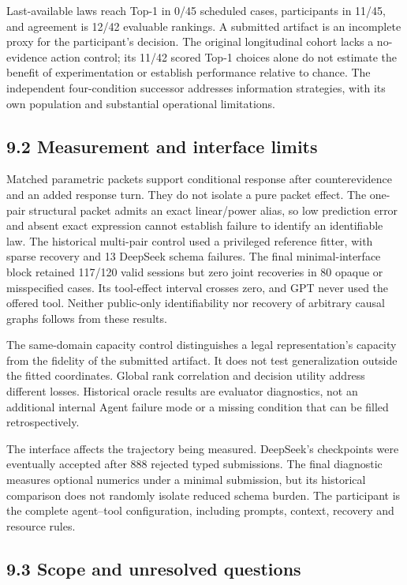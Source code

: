 \documentclass[10pt,twocolumn]{article}
\begin{document}
Last-available laws reach Top-1 in 0/45 scheduled cases, participants in
11/45, and agreement is 12/42 evaluable rankings. A submitted artifact
is an incomplete proxy for the participant's decision. The original
longitudinal cohort lacks a no-evidence action control; its 11/42 scored
Top-1 choices alone do not estimate the benefit of experimentation or
establish performance relative to chance. The independent four-condition
successor addresses information strategies, with its own population and
substantial operational limitations.

\subsection{9.2 Measurement and interface
limits}\label{measurement-and-interface-limits}

Matched parametric packets support conditional response after
counterevidence and an added response turn. They do not isolate a pure
packet effect. The one-pair structural packet admits an exact
linear/power alias, so low prediction error and absent exact expression
cannot establish failure to identify an identifiable law. The historical
multi-pair control used a privileged reference fitter, with sparse
recovery and 13 DeepSeek schema failures. The final minimal-interface
block retained 117/120 valid sessions but zero joint recoveries in 80
opaque or misspecified cases. Its tool-effect interval crosses zero, and
GPT never used the offered tool. Neither public-only identifiability nor
recovery of arbitrary causal graphs follows from these results.

The same-domain capacity control distinguishes a legal representation's
capacity from the fidelity of the submitted artifact. It does not test
generalization outside the fitted coordinates. Global rank correlation
and decision utility address different losses. Historical oracle results
are evaluator diagnostics, not an additional internal Agent failure mode
or a missing condition that can be filled retrospectively.

The interface affects the trajectory being measured. DeepSeek's
checkpoints were eventually accepted after 888 rejected typed
submissions. The final diagnostic measures optional numerics under a
minimal submission, but its historical comparison does not randomly
isolate reduced schema burden. The participant is the complete
agent--tool configuration, including prompts, context, recovery and
resource rules.

\subsection{9.3 Scope and unresolved
questions}\label{scope-and-unresolved-questions}
\end{document}

